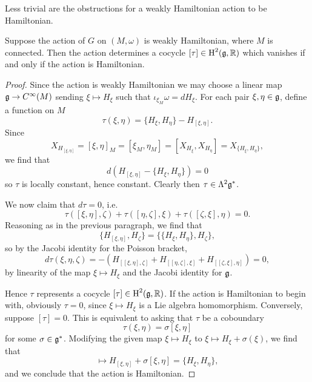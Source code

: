 \documentclass{amsart}
\begin{document}
Less trivial are the obstructions for a weakly Hamiltonian action to be Hamiltonian.
\begin{proposition}
    Suppose the action of $G$ on $(M,\omega)$ is weakly Hamiltonian, where $M$ is connected.
    Then the action
    determines a cocycle $[\tau]\in\operatorname{H}^2(\mathfrak g,\mathbb{R})$ which vanishes if and only if the
    action is Hamiltonian.
\end{proposition}
\begin{proof}
    Since the action is weakly Hamiltonian we may choose a linear map $\mathfrak g\to C^\infty(M)$
    sending $\xi\mapsto H_\xi$ such that $\iota_{\xi_M}\omega=dH_\xi$.
    For each pair $\xi,\eta\in\mathfrak g$, define a function on $M$
    \begin{equation*}
        \tau(\xi,\eta) = \{H_\xi,H_\eta\}-H_{[\xi,\eta]}.
    \end{equation*}
    Since
    \begin{equation*}
        X_{H_{[\xi,\eta]}}=[\xi,\eta]_M=[\xi_M,\eta_M]=[X_{H_\xi},X_{H_\eta}]=X_{\{H_\xi,H_\eta\}},
    \end{equation*}
    we find that
    \begin{equation*}
        d\left(H_{[\xi,\eta]}-\{H_\xi,H_\eta\}\right)=0
    \end{equation*}
    so $\tau$ is locally constant, hence constant. Clearly then $\tau\in\Lambda^2\mathfrak g^*$.

    We now claim that $d\tau=0$, i.e.
    \begin{equation*}
        \tau([\xi,\eta],\zeta) + \tau([\eta,\zeta],\xi)+\tau([\zeta,\xi],\eta) = 0.
    \end{equation*}
    Reasoning as in the previous paragraph, we find that
    \begin{equation*}
        \{H_{[\xi,\eta]},H_\zeta\}=\{\{H_\xi,H_\eta\},H_\zeta\},
    \end{equation*}
    so by the Jacobi identity for the Poisson bracket,
    \begin{equation*}
        d\tau(\xi,\eta,\zeta)=-\left(H_{[ [\xi,\eta],\zeta]}+H_{[ [\eta,\zeta],\xi]}+H_{[ [\zeta,\xi],\eta]}\right)=0,
    \end{equation*}
    by linearity of the map $\xi\mapsto H_\xi$ and the Jacobi identity for $\mathfrak g$.

    Hence $\tau$ represents a cocycle $[\tau]\in\operatorname{H}^2(\mathfrak g,\mathbb{R})$. If the action is Hamiltonian
    to begin with, obviously $\tau=0$, since $\xi\mapsto H_\xi$ is a Lie algebra homomorphism.
    Conversely, suppose $[\tau]=0$. This is equivalent to asking that $\tau$ be a coboundary
    \begin{equation*}
        \tau(\xi,\eta)=\sigma[\xi,\eta]
    \end{equation*}
    for some $\sigma\in\mathfrak g^*$. Modifying the given map $\xi\mapsto H_\xi$ to $\xi\mapsto H_\xi+\sigma(\xi)$,
    we find that
    \begin{equation*}
        [\xi,\eta]\mapsto H_{[\xi,\eta]} + \sigma[\xi,\eta]=\{H_\xi,H_\eta\},
    \end{equation*}
    and we conclude that the action is Hamiltonian.
\end{proof}
\end{document}
